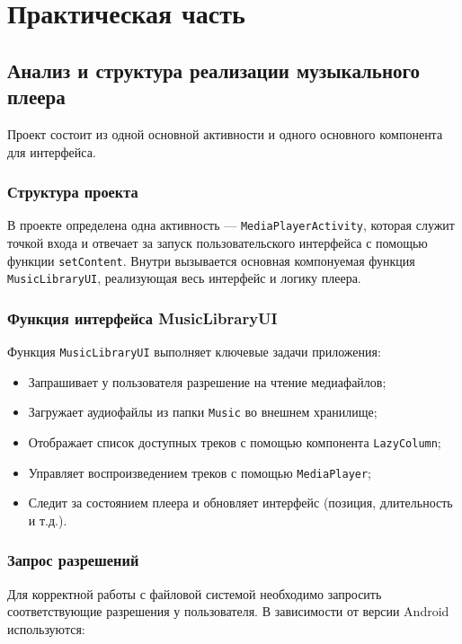 \chapter{Практическая часть}
\section{Анализ и структура реализации музыкального плеера}
Проект состоит из одной основной активности и одного основного компонента для интерфейса.

\subsection{Структура проекта}

В проекте определена одна активность — \texttt{MediaPlayerActivity}, которая служит точкой входа и отвечает за запуск пользовательского интерфейса с помощью функции \texttt{setContent}. Внутри вызывается основная компонуемая функция \texttt{MusicLibraryUI}, реализующая весь интерфейс и логику плеера.

\subsection{Функция интерфейса MusicLibraryUI}

Функция \texttt{MusicLibraryUI} выполняет ключевые задачи приложения:

\begin{itemize}
  \item Запрашивает у пользователя разрешение на чтение медиафайлов;
  \item Загружает аудиофайлы из папки \texttt{Music} во внешнем хранилище;
  \item Отображает список доступных треков с помощью компонента \texttt{LazyColumn};
  \item Управляет воспроизведением треков с помощью \texttt{MediaPlayer};
  \item Следит за состоянием плеера и обновляет интерфейс (позиция, длительность и т.д.).
\end{itemize}

\subsection{Запрос разрешений}

Для корректной работы с файловой системой необходимо запросить соответствующие разрешения у пользователя. В зависимости от версии Android используются:

